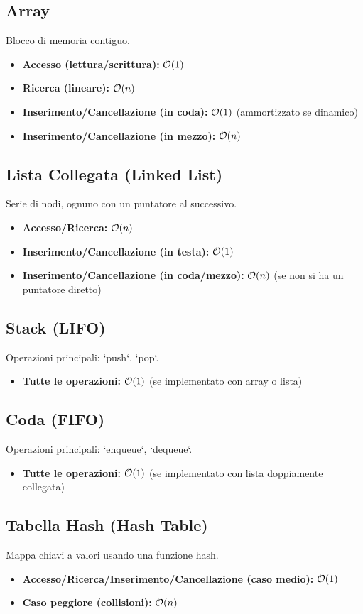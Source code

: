 \subsection*{Array}
Blocco di memoria contiguo.
\begin{itemize}
    \item \textbf{Accesso (lettura/scrittura):} $\mathcal{O}(1)$
    \item \textbf{Ricerca (lineare):} $\mathcal{O}(n)$
    \item \textbf{Inserimento/Cancellazione (in coda):} $\mathcal{O}(1)$ (ammortizzato se dinamico)
    \item \textbf{Inserimento/Cancellazione (in mezzo):} $\mathcal{O}(n)$
\end{itemize}

\subsection*{Lista Collegata (Linked List)}
Serie di nodi, ognuno con un puntatore al successivo.
\begin{itemize}
    \item \textbf{Accesso/Ricerca:} $\mathcal{O}(n)$
    \item \textbf{Inserimento/Cancellazione (in testa):} $\mathcal{O}(1)$
    \item \textbf{Inserimento/Cancellazione (in coda/mezzo):} $\mathcal{O}(n)$ (se non si ha un puntatore diretto)
\end{itemize}

\subsection*{Stack (LIFO)}
Operazioni principali: `push`, `pop`.
\begin{itemize}
    \item \textbf{Tutte le operazioni:} $\mathcal{O}(1)$ (se implementato con array o lista)
\end{itemize}

\subsection*{Coda (FIFO)}
Operazioni principali: `enqueue`, `dequeue`.
\begin{itemize}
    \item \textbf{Tutte le operazioni:} $\mathcal{O}(1)$ (se implementato con lista doppiamente collegata)
\end{itemize}

\subsection*{Tabella Hash (Hash Table)}
Mappa chiavi a valori usando una funzione hash.
\begin{itemize}
    \item \textbf{Accesso/Ricerca/Inserimento/Cancellazione (caso medio):} $\mathcal{O}(1)$
    \item \textbf{Caso peggiore (collisioni):} $\mathcal{O}(n)$
\end{itemize}

